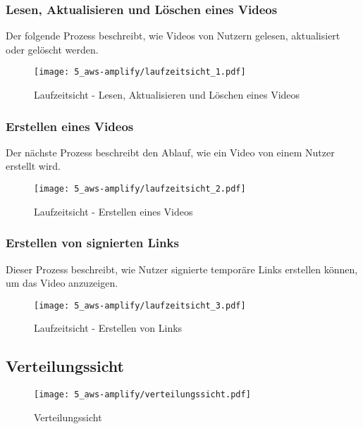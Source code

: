 \subsubsection{Lesen, Aktualisieren und Löschen eines Videos}

Der folgende Prozess beschreibt, wie Videos von Nutzern gelesen, aktualisiert oder gelöscht werden.

\begin{figure}
  \centering
  \texttt{[image: 5\_aws-amplify/laufzeitsicht\_1.pdf]}
  \caption{Laufzeitsicht - Lesen, Aktualisieren und Löschen eines Videos}
  \label{Amplify:laufzeitsicht1}
\end{figure}

\subsubsection{Erstellen eines Videos}

Der nächste Prozess beschreibt den Ablauf, wie ein Video von einem Nutzer erstellt wird.

\begin{figure}
  \centering
  \texttt{[image: 5\_aws-amplify/laufzeitsicht\_2.pdf]}
  \caption{Laufzeitsicht - Erstellen eines Videos}
  \label{Amplify:laufzeitsicht2}
\end{figure}

\subsubsection{Erstellen von signierten Links}

Dieser Prozess beschreibt, wie Nutzer signierte temporäre Links erstellen können, um das Video anzuzeigen.

\begin{figure}
  \centering
  \texttt{[image: 5\_aws-amplify/laufzeitsicht\_3.pdf]}
  \caption{Laufzeitsicht - Erstellen von Links}
  \label{Amplify:laufzeitsicht3}
\end{figure}

\subsection{Verteilungssicht}

\begin{figure}
  \centering
  \texttt{[image: 5\_aws-amplify/verteilungssicht.pdf]}
  \caption{Verteilungssicht}
  \label{Amplify:verteilungssicht}
\end{figure}

